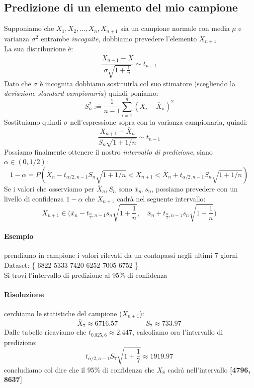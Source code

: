 \documentclass[]{article}
\begin{document}
    \subsection{Predizione di un elemento del mio campione}
    Supponiamo che $X_1, X_2, \ldots, X_n, X_{n+1}$ sia un campione normale con media $\mu$ e varianza $\sigma^2$ entrambe \textit{incognite}, dobbiamo prevedere l'elemento $X_{n+1}$ \\
    La sua distribuzione è:
    $$ \frac{X_{n+1}-\overline{X}}{\sigma\sqrt{1+\frac{1}{n}}} \sim t_{n-1} $$
    Dato che $\sigma$ è incognita dobbiamo sostituirla col suo stimatore (scegliendo la \textit{deviazione standard campionaria}) quindi poniamo:
    \[ S^2_n := \frac{1}{n -1} \sum_{i= 1}^{n} (X_i - \overline{X}_n)^2 \]
    Sostituiamo quindi $\sigma$ nell'espressione sopra con la varianza campionaria, quindi:
    \[ \frac{X_{n+1} - \overline{X}_n}{S_n \sqrt{1 + 1/n}} \sim t_{n-1} \]
    Possiamo finalmente ottenere il nostro \textit{intervallo di predizione}, siano $\alpha \in (0,1 /2)$:
    \[ 1 - \alpha = P \left( \overline{X}_n - t_{\alpha / 2, n-1} S_n \sqrt{1 + 1 / n} < X_{n+1} < \overline{X}_n + t_{\alpha / 2, n-1} S_n \sqrt{1+1/n} \right) \]
    Se i valori che osserviamo per $\overline{X}_n, S_n$ sono $\overline{x}_n, s_n$, possiamo prevedere con un livello di confidenza $1 -\alpha$ che $X_{n+1}$ cadrà nel seguente intervallo:
    \[ X_{n+1} \in \Big(\overline{x}_n-t_{\frac{\alpha}{2}, n-1} s_n\sqrt{1+\frac{1}{n}}, \quad \overline{x}_n+t_{\frac{\alpha}{2}, n-1} s_n\sqrt{1+\frac{1}{n}}\Big) \]
    \paragraph{Esempio} prendiamo in campione i valori rilevati da un contapassi negli ultimi 7 giorni \\
    Dataset: \{ 6822 5333 7420 6252 7005 6752 \} \\
    Si trovi l'intervallo di predizione al 95\% di confidenza
    \paragraph{Risoluzione} cerchiamo le statistiche del campione ($X_{n+1}$):
    \[ \overline{X}_7 \approx 6716.57 \qquad \qquad S_7 \approx 733.97 \]
    Dalle tabelle ricaviamo che $t_{0.025,6} \approx 2.447$, calcoliamo ora l'intervallo di predizione:
    \[ t_{\alpha / 2, n-1} S_7 \sqrt{1 + \frac{1}{7}} \approx \boldsymbol{1919.97} \] 
    concludiamo col dire che il 95\% di confidenza che $X_8$ cadrà nell'intervallo \textbf{[4796, 8637]}
    \newpage
\end{document}
